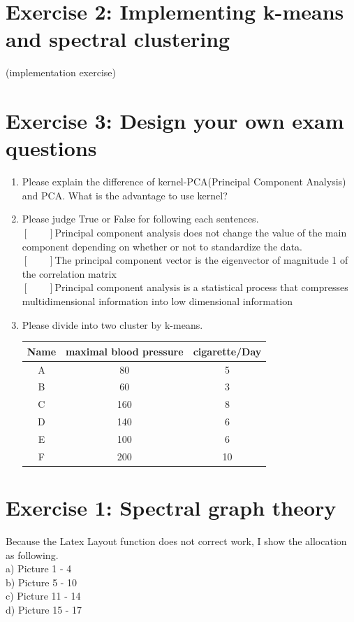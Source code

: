 \documentclass[14pt]{article}
\begin{document}
\section*{Exercise 2: Implementing k-means and spectral clustering}
(implementation exercise)

\section*{Exercise 3: Design your own exam questions}
\begin{enumerate}

\item Please explain the difference of kernel-PCA(Principal Component Analysis) and PCA. What is the advantage to use kernel?

\item Please judge True or False for following each sentences. \\
$[\qquad]$Principal component analysis does not change the value of the main component depending on whether or not to standardize the data. \\
$[\qquad]$The principal component vector is the eigenvector of magnitude 1 of the correlation matrix \\
$[\qquad]$Principal component analysis is a statistical process that compresses multidimensional information into low dimensional information

\item Please divide into two cluster by k-means.
\begin{table}[h]
	\begin{tabular}{|c|c|c|}
	\hline
	Name & maximal blood pressure & cigarette/Day \\ \hline
	A & 80 & 5 \\ \hline
	B & 60 & 3 \\ \hline
	C & 160 & 8 \\ \hline
	D & 140 & 6 \\ \hline
	E & 100 & 6 \\ \hline
	F & 200 & 10 \\ \hline
	\end{tabular}
\end{table}

\end{enumerate}

\section*{Exercise 1: Spectral graph theory}
Because the Latex Layout function does not correct work,
I show the allocation as following.  \\
a) Picture 1 - 4 \\
b) Picture 5 - 10 \\
c) Picture 11 - 14 \\
d) Picture 15 - 17 \\
\end{document}
